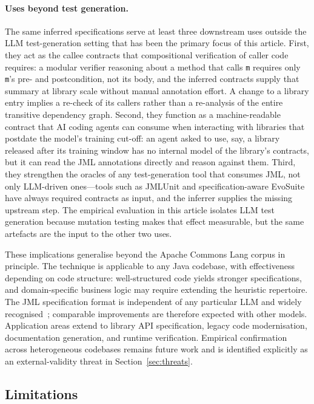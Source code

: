 \paragraph{Uses beyond test generation.} The same inferred specifications serve at least three downstream uses outside the LLM test-generation setting that has been the primary focus of this article. First, they act as the callee contracts that compositional verification of caller code requires: a modular verifier reasoning about a method that calls \texttt{m} requires only \texttt{m}'s pre- and postcondition, not its body, and the inferred contracts supply that summary at library scale without manual annotation effort. A change to a library entry implies a re-check of its callers rather than a re-analysis of the entire transitive dependency graph. Second, they function as a machine-readable contract that AI coding agents can consume when interacting with libraries that postdate the model's training cut-off: an agent asked to use, say, a library released after its training window has no internal model of the library's contracts, but it can read the JML annotations directly and reason against them. Third, they strengthen the oracles of any test-generation tool that consumes JML, not only LLM-driven ones---tools such as JMLUnit and specification-aware EvoSuite have always required contracts as input, and the inferrer supplies the missing upstream step. The empirical evaluation in this article isolates LLM test generation because mutation testing makes that effect measurable, but the same artefacts are the input to the other two uses.

These implications generalise beyond the Apache Commons Lang corpus in principle. The technique is applicable to any Java codebase, with effectiveness depending on code structure: well-structured code yields stronger specifications, and domain-specific business logic may require extending the heuristic repertoire. The JML specification format is independent of any particular LLM and widely recognised~\cite{leavens2006design}; comparable improvements are therefore expected with other models. Application areas extend to library API specification, legacy code modernisation, documentation generation, and runtime verification. Empirical confirmation across heterogeneous codebases remains future work and is identified explicitly as an external-validity threat in Section~\ref{sec:threats}.

\subsection{Limitations}

